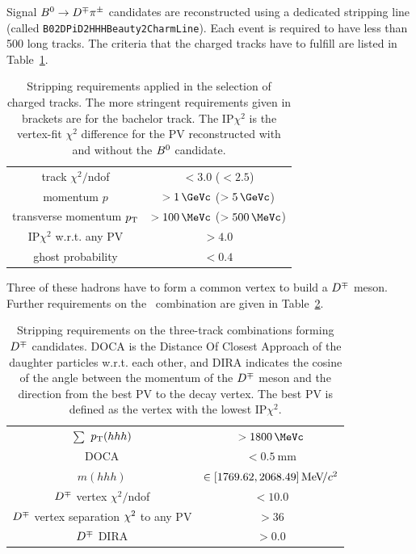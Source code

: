 Signal $B^0\rightarrow D^\mp\pi^\pm$ candidates are reconstructed using a dedicated stripping line
(called \verb!B02DPiD2HHHBeauty2CharmLine!). Each event is required to have less than
\num{500} long tracks. The criteria that the charged tracks have to
fulfill are listed in Table~\ref{tab:strippingDaughters}.
%
\begin{table}[b!]
	\centering
	\caption{Stripping requirements applied in the selection of charged tracks. The more stringent
	  requirements given in brackets are for the bachelor track. The IP$\chi^2$ is 
          the vertex-fit $\chi^2$ difference for the PV reconstructed with and without the $B^0$ candidate.}
	\begin{tabular}{cc}
		\toprule
		track $\chi^2/$ndof & $<\num{3.0}$ ($<\num{2.5}$)\\
		momentum $p$ & $>\SI{1}{\GeVc}$ ($>\SI{5}{\GeVc}$)\\
		transverse momentum $\mbox{$p_{\rm T}$}$ & $>\SI{100}{\MeVc}$ ($>\SI{500}{\MeVc}$)\\
		IP$\chi^2$ w.r.t. any PV & $>\num{4.0}$\\
		ghost probability & $<\num{0.4}$\\
		\bottomrule
	\end{tabular}
	\label{tab:strippingDaughters}
\end{table}
%
Three of these hadrons have to form a common vertex to build a $D^\mp$ meson. 
Further requirements on the \Dmp~combination are given in
Table~\ref{tab:strippingD}.
%
\begin{table}[htbp]
	\centering
	\caption{Stripping requirements on the three-track combinations forming $D^\mp$ candidates. DOCA is the Distance Of
	  Closest Approach of the daughter particles w.r.t. each other, and
	  DIRA indicates the cosine of the angle between the momentum of the $D^\mp$
	  meson and the direction from the best PV to the decay vertex. The best PV is defined as
	  the vertex with the lowest IP$\chi^2$.}
	\begin{tabular}{cc}
		\toprule
		$\sum$ $\mbox{$p_{\rm T}$}(hhh)$ & $>\SI{1800}{\MeVc}$\\
		DOCA & $<\SI{0.5}{\milli\metre}$\\
		$m(hhh)$ & $\in[1769.62,2068.49]{\mathrm{\,Me\kern -0.1em V\!/}c^2}$\\
		$D^\mp$ vertex $\chi^2/$ndof & $<\num{10.0}$\\
		$D^\mp$ vertex separation $\chi^2$ to any PV & $>\num{36}$\\
		$D^\mp$ DIRA & $>\num{0.0}$\\
		\bottomrule
	\end{tabular}
	\label{tab:strippingD}
\end{table}
